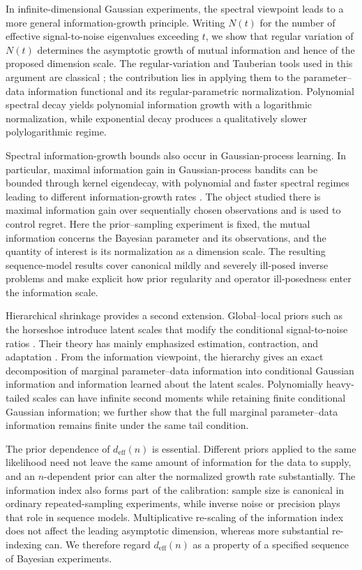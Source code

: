 \documentclass[11pt]{article}
\theoremstyle{plain}
\theoremstyle{definition}
\theoremstyle{remark}
\begin{document}
In infinite-dimensional Gaussian experiments, the spectral viewpoint leads to a more general information-growth principle. Writing \(N(t)\) for the number of effective signal-to-noise eigenvalues exceeding \(t\), we show that regular variation of \(N(t)\) determines the asymptotic growth of mutual information and hence of the proposed dimension scale. The regular-variation and Tauberian tools used in this argument are classical \citep{bingham1987regular}; the contribution lies in applying them to the parameter--data information functional and its regular-parametric normalization. Polynomial spectral decay yields polynomial information growth with a logarithmic normalization, while exponential decay produces a qualitatively slower polylogarithmic regime.

Spectral information-growth bounds also occur in Gaussian-process learning. In particular, maximal information gain in Gaussian-process bandits can be bounded through kernel eigendecay, with polynomial and faster spectral regimes leading to different information-growth rates \citep{vakili2021information}. The object studied there is maximal information gain over sequentially chosen observations and is used to control regret. Here the prior--sampling experiment is fixed, the mutual information concerns the Bayesian parameter and its observations, and the quantity of interest is its normalization as a dimension scale. The resulting sequence-model results cover canonical mildly and severely ill-posed inverse problems and make explicit how prior regularity and operator ill-posedness enter the information scale.

Hierarchical shrinkage provides a second extension. Global--local priors such as the horseshoe introduce latent scales that modify the conditional signal-to-noise ratios \citep{polson2010shrink,carvalho2010horseshoe,bhadra2019lasso}. Their theory has mainly emphasized estimation, contraction, and adaptation \citep{datta2013asymptotic,van2014horseshoe,van2017adaptive,banerjee2026bayesian}. From the information viewpoint, the hierarchy gives an exact decomposition of marginal parameter--data information into conditional Gaussian information and information learned about the latent scales. Polynomially heavy-tailed scales can have infinite second moments while retaining finite conditional Gaussian information; we further show that the full marginal parameter–data information remains finite under the same tail condition.

The prior dependence of \(d_{\mathrm{eff}}(n)\) is essential. Different priors applied to the same likelihood need not leave the same amount of information for the data to supply, and an \(n\)-dependent prior can alter the normalized growth rate substantially. The information index also forms part of the calibration: sample size is canonical in ordinary repeated-sampling experiments, while inverse noise or precision plays that role in sequence models. Multiplicative re-scaling of the information index does not affect the leading asymptotic dimension, whereas more substantial re-indexing can. We therefore regard \(d_{\mathrm{eff}}(n)\) as a property of a specified sequence of Bayesian experiments.
\end{document}
